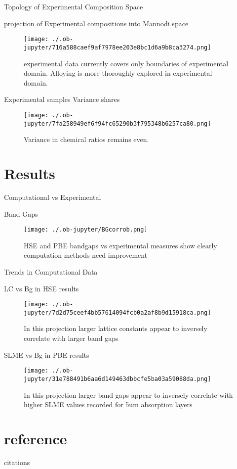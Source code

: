 \documentclass[9pt, compress]{beamer}
\begin{document}
\begin{frame}[allowframebreaks]{Topology of Experimental Composition Space}
\begin{block}{projection of Experimental compositions into Mannodi space}
\begin{figure}[htbp]
\centering
\texttt{[image: ./.ob-jupyter/716a588caef9af7978ee203e8bc1d6a9b8ca3274.png]}
\caption{experimental data currently covers only boundaries of experimental domain. Alloying is more thoroughly explored in experimental domain.}
\end{figure}
\end{block}
\begin{block}{Experimental samples Variance shares}
\begin{figure}[htbp]
\centering
\texttt{[image: ./.ob-jupyter/7fa258949ef6f94fc65290b3f795348b6257ca80.png]}
\caption{Variance in chemical ratios remains even.}
\end{figure}
\end{block}
\end{frame}
\section{Results}
\label{sec:org874c373}
\begin{frame}[allowframebreaks]{Computational vs Experimental}
\begin{block}{Band Gaps}
\begin{figure}[htbp]
\centering
\texttt{[image: ./.ob-jupyter/BGcorrob.png]}
\caption{\label{fig:bg_corr} HSE and PBE bandgaps vs experimental measures show clearly computation methods need improvement}
\end{figure}
\end{block}
\end{frame}
\begin{frame}[allowframebreaks]{Trends in Computational Data}
\begin{block}{LC vs Bg in HSE results}
\begin{figure}[htbp]
\centering
\texttt{[image: ./.ob-jupyter/7d2d75ceef4bb57614094fcb0a2af8b9d15918ca.png]}
\caption{\label{fig:HSE_clust} In this projection larger lattice constants appear to inversely correlate with larger band gaps}
\end{figure}
\end{block}
\begin{block}{SLME vs Bg in PBE results}
\begin{figure}[htbp]
\centering
\texttt{[image: ./.ob-jupyter/31e788491b6aa6d149463dbbcfe5ba03a59088da.png]}
\caption{\label{fig:PBE_clust} In this projection larger band gaps appear to inversely correlate with higher SLME values recorded for 5um absorption layers}
\end{figure}
\end{block}
\end{frame}
\section{reference}
\label{sec:org329dce2}
\begin{frame}[label={sec:org45234c9}]{citations}


\end{frame}
\end{document}
